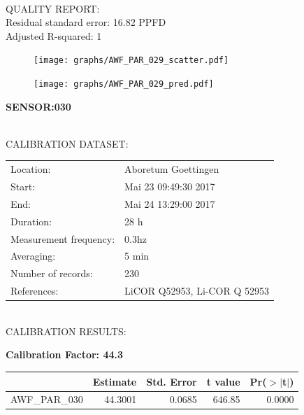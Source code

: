 \documentclass[oneside]{report}
\begin{document}
\hrulefill\\
QUALITY REPORT:\\
Residual standard error: 16.82 PPFD\\
Adjusted R-squared: 1



\begin{figure}[H]
  \centering
  \texttt{[image: graphs/AWF\_PAR\_029\_scatter.pdf]}
\end{figure}




\begin{figure}[H]
  \centering
  \texttt{[image: graphs/AWF\_PAR\_029\_pred.pdf]}
\end{figure}

\pagebreak


\begin{center}
\large{\textbf{SENSOR:030}}\\
\end{center}

\hrulefill\\
CALIBRATION DATASET:\\
\begin{table}[h!]
  \centering
  \label{tab:table1}
  \begin{tabular}{ll}
    Location: & Aboretum Goettingen\\ 
    
    
    Start:  & Mai 23 09:49:30 2017 \\
    End:   & Mai 24 13:29:00 2017\\ 
    Duration: & 28 h\\
    Measurement frequency: & 0.3hz\\
    Averaging:  &5 min\\
    Number of records: & 230 \\
    References: & LiCOR Q52953, Li-COR Q 52953 \\
  \end{tabular}
\end{table}

\hrulefill\\
CALIBRATION RESULTS:\\


\begin{center}
\textbf{\large{Calibration Factor: 44.3}}\\
\end{center}
\begin{table}[ht]
\centering
\begin{tabular}{rrrrr}
  \hline
 & Estimate & Std. Error & t value & Pr($>$$|$t$|$) \\ 
  \hline
AWF\_PAR\_030 & 44.3001 & 0.0685 & 646.85 & 0.0000 \\ 
   \hline
\end{tabular}
\end{table}
\end{document}
